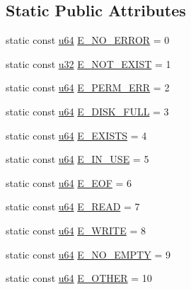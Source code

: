 \subsection*{Static Public Attributes}
\begin{DoxyCompactItemize}
\item 
static const \hyperlink{_portable_8h_ad758b7a5c3f18ed79d2fcd23d9f16357}{u64} \hyperlink{classmsfs_1_1_file_a54596794c43cd9eb2cfb9d3484b69153}{E\+\_\+\+N\+O\+\_\+\+E\+R\+R\+O\+R} = 0
\item 
static const \hyperlink{_portable_8h_a10e94b422ef0c20dcdec20d31a1f5049}{u32} \hyperlink{classmsfs_1_1_file_ad59b27fa86eefd41c1557ed92436e46b}{E\+\_\+\+N\+O\+T\+\_\+\+E\+X\+I\+S\+T} = 1
\item 
static const \hyperlink{_portable_8h_ad758b7a5c3f18ed79d2fcd23d9f16357}{u64} \hyperlink{classmsfs_1_1_file_aaa340983eb246794bd9b4b218f29686c}{E\+\_\+\+P\+E\+R\+M\+\_\+\+E\+R\+R} = 2
\item 
static const \hyperlink{_portable_8h_ad758b7a5c3f18ed79d2fcd23d9f16357}{u64} \hyperlink{classmsfs_1_1_file_a866824e44012b4ecef984e0bdce324ec}{E\+\_\+\+D\+I\+S\+K\+\_\+\+F\+U\+L\+L} = 3
\item 
static const \hyperlink{_portable_8h_ad758b7a5c3f18ed79d2fcd23d9f16357}{u64} \hyperlink{classmsfs_1_1_file_a95502138fd077a99ec58121c316584e7}{E\+\_\+\+E\+X\+I\+S\+T\+S} = 4
\item 
static const \hyperlink{_portable_8h_ad758b7a5c3f18ed79d2fcd23d9f16357}{u64} \hyperlink{classmsfs_1_1_file_a36bd65e6947a0f87e774fb5067a02867}{E\+\_\+\+I\+N\+\_\+\+U\+S\+E} = 5
\item 
static const \hyperlink{_portable_8h_ad758b7a5c3f18ed79d2fcd23d9f16357}{u64} \hyperlink{classmsfs_1_1_file_a0d94b1f5c3c680e4d6f1e72b6e30be91}{E\+\_\+\+E\+O\+F} = 6
\item 
static const \hyperlink{_portable_8h_ad758b7a5c3f18ed79d2fcd23d9f16357}{u64} \hyperlink{classmsfs_1_1_file_ae47ffd6a21e486df2fae5b0bb1532f8d}{E\+\_\+\+R\+E\+A\+D} = 7
\item 
static const \hyperlink{_portable_8h_ad758b7a5c3f18ed79d2fcd23d9f16357}{u64} \hyperlink{classmsfs_1_1_file_adf78f7dc3faf93c0b6cf4ca4cfe4c34a}{E\+\_\+\+W\+R\+I\+T\+E} = 8
\item 
static const \hyperlink{_portable_8h_ad758b7a5c3f18ed79d2fcd23d9f16357}{u64} \hyperlink{classmsfs_1_1_file_ab4121efa6b5e7ba520915a051d3b8474}{E\+\_\+\+N\+O\+\_\+\+E\+M\+P\+T\+Y} = 9
\item 
static const \hyperlink{_portable_8h_ad758b7a5c3f18ed79d2fcd23d9f16357}{u64} \hyperlink{classmsfs_1_1_file_a57847c96ccd044502e1592d08a04e790}{E\+\_\+\+O\+T\+H\+E\+R} = 10
\end{DoxyCompactItemize}
